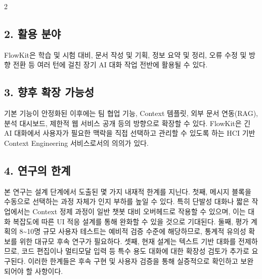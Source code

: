 \documentclass[10pt, a4paper]{article}
\begin{document}
\begin{multicols}{2}
\subsection*{2. 활용 분야}

FlowKit은 학습 및 시험 대비, 문서 작성 및 기획, 정보 요약 및 정리, 오류 수정 및 방향 전환 등 여러 턴에 걸친 장기 AI 대화 작업 전반에 활용될 수 있다.

\subsection*{3. 향후 확장 가능성}

기본 기능이 안정화된 이후에는 팀 협업 기능, Context 템플릿, 외부 문서 연동(RAG), 분석 대시보드, 제한적 웹 서비스 공개 등의 방향으로 확장할 수 있다. FlowKit은 긴 AI 대화에서 사용자가 필요한 맥락을 직접 선택하고 관리할 수 있도록 하는 HCI 기반 Context Engineering 서비스로서의 의의가 있다.

\subsection*{4. 연구의 한계}

본 연구는 설계 단계에서 도출된 몇 가지 내재적 한계를 지닌다. 첫째, 메시지 블록을 수동으로 선택하는 과정 자체가 인지 부하를 높일 수 있다. 특히 단발성 대화나 짧은 작업에서는 Context 정제 과정이 일반 챗봇 대비 오버헤드로 작용할 수 있으며, 이는 대화 복잡도에 따른 UI 적응 설계를 통해 완화할 수 있을 것으로 기대된다. 둘째, 평가 계획의 8\textasciitilde10명 규모 사용자 테스트는 예비적 검증 수준에 해당하므로, 통계적 유의성 확보를 위한 대규모 후속 연구가 필요하다. 셋째, 현재 설계는 텍스트 기반 대화를 전제하므로, 코드 편집이나 멀티모달 입력 등 특수 용도 대화에 대한 확장성 검토가 추가로 요구된다. 이러한 한계들은 후속 구현 및 사용자 검증을 통해 실증적으로 확인하고 보완되어야 할 사항이다.

\end{multicols}
\end{document}
